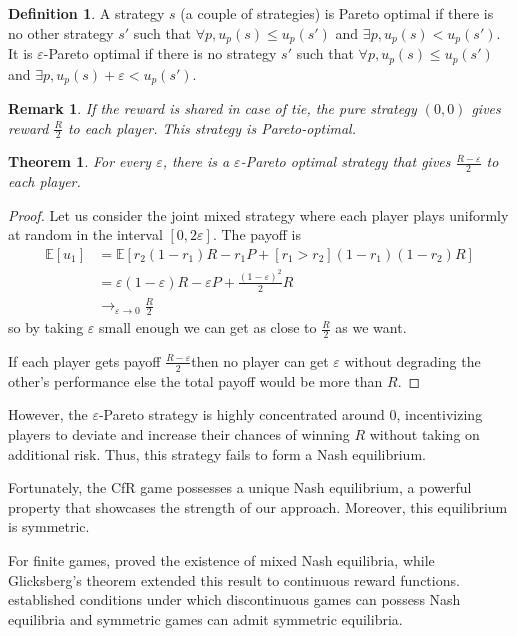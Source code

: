 \documentclass[preprint,12pt,authoryear]{elsarticle}
\newtheorem{theorem}{Theorem}[section]
\newtheorem*{remark}{Remark}
\theoremstyle{definition}
\newtheorem{definition}{Definition}[section]
\begin{document}
\begin{definition}A strategy $s$ (a couple of strategies) is Pareto optimal if there is no other strategy $s'$ such that $\forall p, u_p(s) \le u_p(s')$ and $\exists p, u_p(s) < u_p(s')$. It is $\varepsilon$-Pareto optimal if there is no strategy $s'$ such that $\forall p, u_p(s) \le u_p(s')$ and $\exists p, u_p(s) + \varepsilon < u_p(s')$.
\end{definition}
\begin{remark} If the reward is shared in case of tie, the pure strategy $(0,0)$ gives reward $\frac{R}{2}$ to each player. This strategy is Pareto-optimal.
\end{remark}
\begin{theorem}
\label{thm:pareto}
For every $\varepsilon$, there is a $\varepsilon$-Pareto optimal strategy that gives $\frac{R - \varepsilon}{2}$ to each player.
\end{theorem}
\begin{proof}
Let us consider the joint mixed strategy where each player plays uniformly at random in the interval $[0, 2 \varepsilon]$. The payoff is
\begin{align*} \mathbb{E}[u_1] &= \mathbb{E}\left[ r_2 (1-r_1) R - r_1 P + [ r_1 > r_2 ](1-r_1)(1-r_2) R\right] \\ &= \varepsilon (1-\varepsilon) R - \varepsilon P + \frac{(1-\varepsilon)^2}{2} R \\
&\rightarrow_{\varepsilon \rightarrow 0} \frac{R}{2} \end{align*}
so by taking $\varepsilon$ small enough we can get as close to $\frac{R}{2}$ as we want.

If each player gets payoff $\frac{R - \varepsilon}{2}$then no player can get $\varepsilon$ without degrading the other’s performance else the total payoff would be more than $R$.
\end{proof}

However, the $\varepsilon$-Pareto strategy is highly concentrated around $0$, incentivizing players to deviate and increase their chances of winning $R$ without taking on additional risk. Thus, this strategy fails to form a Nash equilibrium.

Fortunately, the CfR game possesses a unique Nash equilibrium, a powerful property that showcases the strength of our approach. Moreover, this equilibrium is symmetric.

For finite games, \citet{Nash1950-jp} proved the existence of mixed Nash equilibria, while Glicksberg's theorem \citep{Glicksberg1951-wp} extended  this result to continuous reward functions. \citet{Dasgupta1986-gu} established conditions under which discontinuous games can possess Nash equilibria and symmetric games can admit symmetric equilibria.
\end{document}
